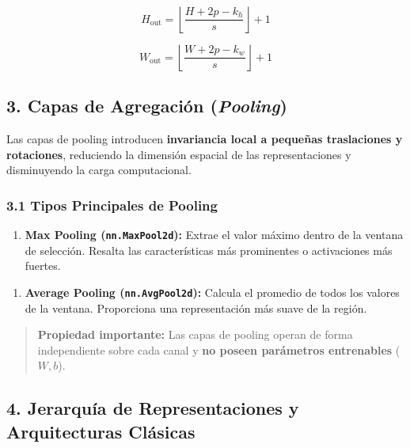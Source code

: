 \documentclass[11pt,oneside]{article}
\begin{document}
\[H_{\text{out}} = \left\lfloor \frac{H + 2p - k_h}{s} \right\rfloor + 1\]

\[W_{\text{out}} = \left\lfloor \frac{W + 2p - k_w}{s} \right\rfloor + 1\]

\subsection{3. Capas de Agregación (\emph{Pooling})}

Las capas de pooling introducen \textbf{invariancia local a pequeñas traslaciones y rotaciones}, reduciendo la dimensión espacial de las representaciones y disminuyendo la carga computacional.

\subsubsection{3.1 Tipos Principales de Pooling}

\begin{enumerate}

\item \textbf{Max Pooling (\texttt{nn.MaxPool2d}):} Extrae el valor máximo dentro de la ventana de selección. Resalta las características más prominentes o activaciones más fuertes.

\end{enumerate}

\begin{enumerate}

\item \textbf{Average Pooling (\texttt{nn.AvgPool2d}):} Calcula el promedio de todos los valores de la ventana. Proporciona una representación más suave de la región.

\end{enumerate}

\begin{quote}\textbf{Propiedad importante:} Las capas de pooling operan de forma independiente sobre cada canal y \textbf{no poseen parámetros entrenables} (\(W, b\)).\end{quote}

\begin{quote}\end{quote}

\begin{quote}\end{quote}

\subsection{4. Jerarquía de Representaciones y Arquitecturas Clásicas}
\end{document}
